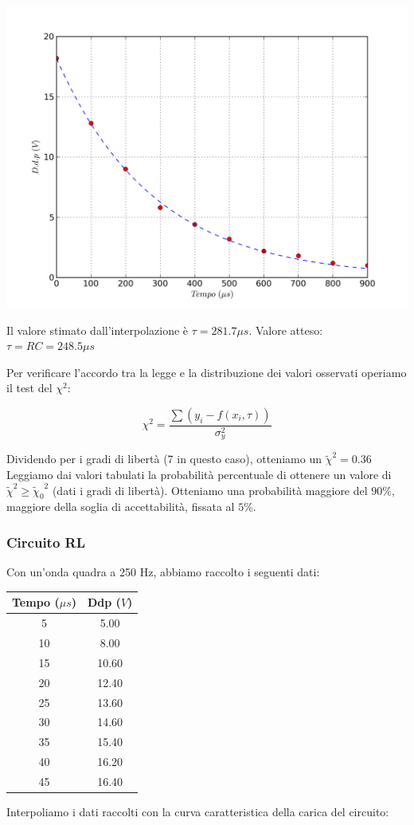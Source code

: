 \begin{center}
 \includegraphics[scale=0.70]{grafici/C3/fitcond.png}
\end{center}

Il valore stimato dall'interpolazione è $\tau=281.7 \mu s$.
Valore atteso: $\tau=RC=248.5 \mu s$

Per verificare l'accordo tra la legge e la distribuzione dei valori osservati operiamo il test del $\chi^2$:

$$ \chi^2 = \frac{\sum{(y_i - f(x_i,\tau ))}}{\sigma_y^2} $$

Dividendo per i gradi di libertà (7 in questo caso), otteniamo un $\tilde{\chi}^2 = 0.36 $ \\
Leggiamo dai valori tabulati la probabilità percentuale di ottenere un valore di $\tilde{\chi}^2 \geq {\tilde{\chi}_0}^2 $ (dati i gradi di libertà). Otteniamo una probabilità maggiore del $90\%$, maggiore della soglia di accettabilità, fissata al $5\%$. 


\subsubsection{Circuito RL}
Con un'onda quadra a 250 Hz, abbiamo raccolto i seguenti dati:

\begin{center}
\begin{tabular}{*{2}{c}}
Tempo ($\mu s$) & Ddp ($V$) \\
\midrule
5 & 5.00 \\
10 & 8.00 \\
15 & 10.60 \\
20 & 12.40 \\
25 & 13.60 \\
30 & 14.60 \\
35 & 15.40 \\
40 & 16.20 \\
45 & 16.40 \\
\end{tabular}
\end{center}
Interpoliamo i dati raccolti con la curva caratteristica della carica del circuito:

